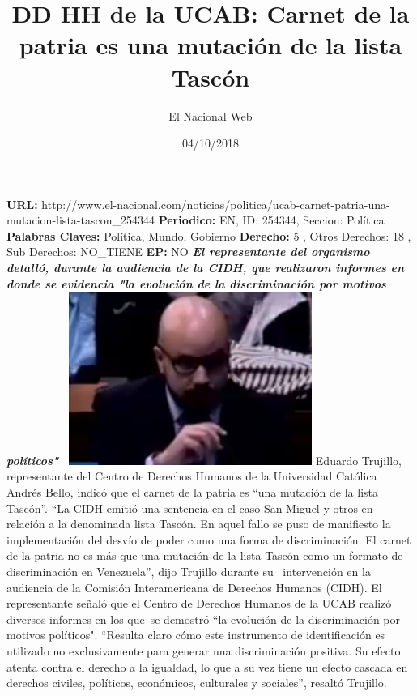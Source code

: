 \documentclass{article}%
\title{\textbf{DD HH de la UCAB: Carnet de la patria es una mutación de la lista Tascón}}%
\author{El Nacional Web}%
\date{04/10/2018}%
\begin{document}
%
\normalsize%
\maketitle%
\textbf{URL: }%
http://www.el{-}nacional.com/noticias/politica/ucab{-}carnet{-}patria{-}una{-}mutacion{-}lista{-}tascon\_254344\newline%
%
\textbf{Periodico: }%
EN, %
ID: %
254344, %
Seccion: %
Política\newline%
%
\textbf{Palabras Claves: }%
Política, Mundo, Gobierno\newline%
%
\textbf{Derecho: }%
5%
, Otros Derechos: %
18%
, Sub Derechos: %
NO\_TIENE%
\newline%
%
\textbf{EP: }%
NO\newline%
\newline%
%
\textbf{\textit{El representante del organismo detalló, durante la audiencia de la CIDH, que realizaron informes en donde se evidencia "la evolución de la discriminación por motivos políticos"~}}%
\newline%
\newline%
%
\includegraphics[width=300px]{209.jpg}%
\newline%
%
Eduardo Trujillo, representante del Centro de Derechos Humanos de la Universidad Católica Andrés Bello, indicó que el carnet de la patria es “una mutación de la lista Tascón”.%
\newline%
%
“La CIDH emitió una sentencia en el caso San Miguel y otros en relación a la denominada lista Tascón. En aquel fallo se puso de manifiesto la implementación del desvío de poder como una forma de discriminación. El carnet de la patria no es más que una mutación de la lista Tascón como un formato de discriminación en Venezuela”, dijo Trujillo durante su~ intervención en la audiencia de la Comisión Interamericana de Derechos Humanos (CIDH).%
\newline%
%
El representante señaló que el Centro de Derechos Humanos de la UCAB realizó diversos informes en los que~se demostró “la evolución de la discriminación por motivos políticos".%
\newline%
%
“Resulta claro cómo este instrumento de identificación es utilizado no exclusivamente para generar una discriminación positiva. Su efecto atenta contra el derecho a la igualdad, lo que a su vez tiene un efecto cascada en derechos civiles, políticos, económicos, culturales y sociales”, resaltó Trujillo.%
\newline%
%
\end{document}
